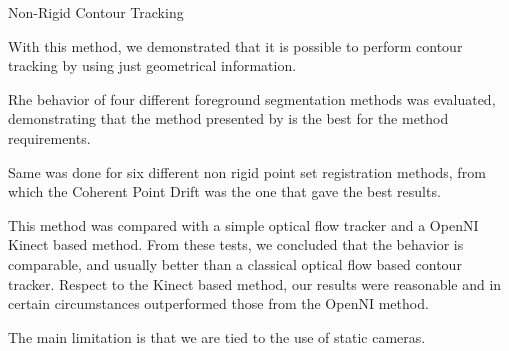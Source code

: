 \begin{frame}{Non-Rigid Contour Tracking}
  \small
  \begin{itemize}
     {
    \item With this method, we demonstrated that it is possible to perform contour tracking by using just geometrical information. \item Rhe behavior of four different foreground segmentation methods \citep{lopez2011stochastic, lopez2011foreground, guo2011hierarchical, reddy2012improved} was evaluated, demonstrating that the method presented by \cite{reddy2012improved} is the best for the method requirements.
    \item Same was done for six different non rigid point set registration methods, from which the Coherent Point Drift was the one that gave the best results. 
    }
     {
    \item This method was compared with a simple optical flow tracker and a OpenNI Kinect based method. From these tests, we concluded that the behavior is comparable, and usually better than a classical optical flow based contour tracker. Respect to the Kinect based method, our results were reasonable and in certain circumstances outperformed those from the OpenNI method.
    \item The main limitation is that we are tied to the use of static cameras.
    }
  \end{itemize}
\end{frame}

